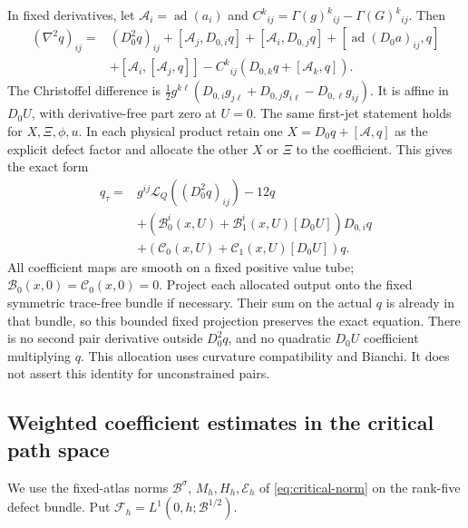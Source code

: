 \documentclass[11pt]{article}
\numberwithin{equation}{section}
\theoremstyle{definition}
\theoremstyle{remark}
\begin{document}
In fixed derivatives, let \(\mathcal A_i=\operatorname{ad}(a_i)\)
and \(C^k{}_{ij}=\Gamma(g)^k{}_{ij}-\Gamma(G)^k{}_{ij}\).
Then
\[
 \begin{split}
 (\nabla^2q)_{ij}={}&(D_0^2q)_{ij}
 +[\mathcal A_j,D_{0,i}q]+[\mathcal A_i,D_{0,j}q]
 +[\operatorname{ad}(D_0a)_{ij},q]\\
 &+[\mathcal A_i,[\mathcal A_j,q]]
       -C^k{}_{ij}(D_{0,k}q+[\mathcal A_k,q]).
 \end{split}
\]
The Christoffel difference is
\(\tfrac12g^{k\ell}(D_{0,i}g_{j\ell}
+D_{0,j}g_{i\ell}-D_{0,\ell}g_{ij})\).
It is affine in \(D_0U\), with derivative-free part
zero at \(U=0\). The same first-jet statement holds
for \(X,\Xi,\phi,u\). In each physical product retain
one \(X=D_0q+[\mathcal A,q]\) as the explicit defect
factor and allocate the other \(X\) or \(\Xi\) to the
coefficient. This gives the exact form
\begin{equation}\label{eq:endpoint-pair-coefficients}
 \begin{split}
 q_\tau={}&g^{ij}\mathscr L_Q((D_0^2q)_{ij})-12q\\
 &+(\mathcal B_0^i(x,U)+\mathcal B_1^i(x,U)[D_0U])D_{0,i}q\\
 &+(\mathcal C_0(x,U)+\mathcal C_1(x,U)[D_0U])q .
 \end{split}
\end{equation}
All coefficient maps are smooth on a fixed positive value
tube; \(\mathcal B_0(x,0)=\mathcal C_0(x,0)=0\).
Project each allocated output onto the fixed symmetric
trace-free bundle if necessary. Their sum on the actual
\(q\) is already in that bundle, so this bounded fixed
projection preserves the exact equation.
There is no second pair derivative outside \(D_0^2q\),
and no quadratic \(D_0U\) coefficient multiplying \(q\).
This allocation uses curvature compatibility and Bianchi.
It does not assert this identity for unconstrained pairs.

\subsection{Weighted coefficient estimates in the critical path space}
\label{subsec:mixed-endpoint-products}

We use the fixed-atlas norms \(\mathcal B^\sigma\),
\(M_h,H_h,\mathcal E_h\) of \eqref{eq:critical-norm}
on the rank-five defect bundle. Put
\(\mathcal F_h=L^1(0,h;\mathcal B^{1/2})\).
\end{document}
